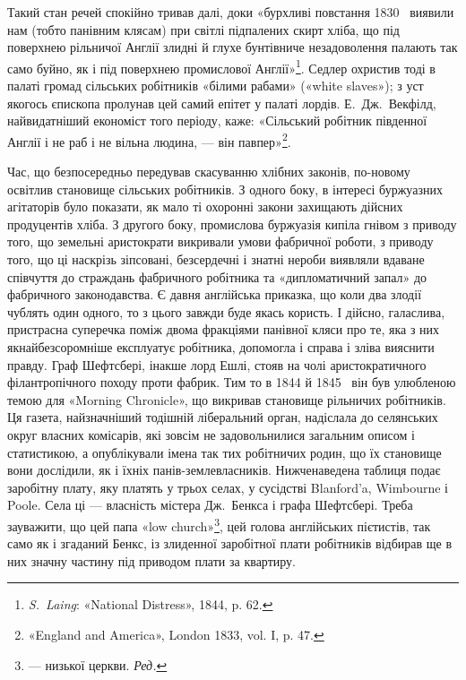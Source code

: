 Такий стан речей спокійно тривав далі, доки «бурхливі повстання
1830~ виявили нам (тобто панівним клясам) при світлі
підпалених скирт хліба, що під поверхнею рільничої Англії
злидні й глухе бунтівниче незадоволення палають так само буйно,
як і під поверхнею промислової Англії»\footnote{
\emph{S.~Laing}: «National Distress», 1844, p. 62.
}. Седлер охристив тоді
в палаті громад сільських робітників «білими рабами» («white
slaves»); з уст якогось єпископа пролунав цей самий епітет у палаті
лордів. Е.~Дж.~Векфілд, найвидатніший економіст того періоду,
каже: «Сільський робітник південної Англії і не раб
і не вільна людина, — він павпер»\footnote{
«England and America», London 1833, vol. I, p. 47.
}.

Час, що безпосередньо передував скасуванню хлібних законів,
по-новому освітлив становище сільських робітників. З одного
боку, в інтересі буржуазних агітаторів було показати, як
мало ті охоронні закони захищають дійсних продуцентів хліба.
З другого боку, промислова буржуазія кипіла гнівом з приводу
того, що земельні аристократи викривали умови фабричної роботи,
з приводу того, що ці наскрізь зіпсовані, безсердечні і
знатні нероби виявляли вдаване співчуття до страждань фабричного
робітника та «дипломатичний запал» до фабричного законодавства.
Є давня англійська приказка, що коли два злодії
чублять один одного, то з цього завжди буде якась користь.
І дійсно, галаслива, пристрасна суперечка поміж двома фракціями
панівної кляси про те, яка з них якнайбезсоромніше експлуатує
робітника, допомогла і справа і зліва вияснити правду. Граф
Шефтсбері, інакше лорд Ешлі, стояв на чолі аристократичного
філантропічного походу проти фабрик. Тим то в 1844 й
1845~ він був улюбленою темою для «Morning Chronicle», що
викривав становище рільничих робітників. Ця газета, найзначніший
тодішній ліберальний орган, надіслала до селянських округ
власних комісарів, які зовсім не задовольнилися загальним
описом і статистикою, а опублікували імена так тих робітничих
родин, що їх становище вони дослідили, як і їхніх панів-землевласників.
Нижченаведена таблиця подає заробітну плату,
яку платять у трьох селах, у сусідстві Blanford’a, Wimbourne
і Poole. Села ці — власність містера Дж.~Бенкса і графа Шефтсбері.
Треба зауважити, що цей папа «low church»\footnote*{
— низької церкви. \emph{Ред.}
}, цей голова англійських
пієтистів, так само як і згаданий Бенкс, із злиденної
заробітної плати робітників відбирав ще в них значну частину
під приводом плати за квартиру.

